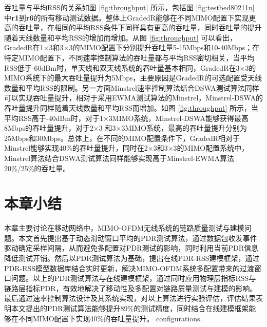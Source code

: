 吞吐量与平均RSS的关系如图 \ref{fig:throughput} 所示，包括图 \ref{fig:testbed80211n} 中\textbf{r1}到\textbf{r6}的所有移动测试数据。整体上GradedR能够在不同MIMO配置下实现更高的吞吐量，在相同的平均RSS条件下同样具有更高的吞吐量，同时吞吐量的提升随着天线数量和平均RSS的增加而增加。从图 \ref{fig:throughput} 可以看出，GradedR在1$\times$3和3$\times$3的MIMO配置下分别提升吞吐量5-15Mbps和10-40Mbps；在特定MIMO配置下，不同速率控制算法的吞吐量都与平均RSS密切相关，当平均RSS低于-60dBm时，单天线和双天线系统的吞吐量基本相同，GradedR在3$\times$3的MIMO系统下的最大吞吐量提升为5Mbps，主要原因是GradedR的可选配置受天线数量和平均RSS的限制。另一方面Minstrel速率控制算法结合DSWA测试算法同样可以实现吞吐量提升，相对于采用EWMA测试算法的Minstrel，Minstrel-DSWA的吞吐量提升同样随着天线数量和平均RSS而增加。如图 \ref{fig:throughput} 所示，当平均RSS高于-40dBm时，对于1$\times$3MIMO系统，Minstrel-DSWA能够获得最高8Mbps的吞吐量提升，对于2$\times$3 和3$\times$3MIMO系统，最高的吞吐量提升分别为25Mbps和30Mbps。总体上，在不同的MIMO配置条件下，GradedR相对于Minstrel能够实现40\%的吞吐量提升，同时在2$\times$3和3$\times$3的MIMO配置系统中，Minstrel算法结合DSWA测试算法同样能够实现高于Minstrel-EWMA算法20\%/25\%的吞吐量。


\section{本章小结}
\label{sec:conclusion3}

本章主要讨论在移动网络中，MIMO-OFDM无线系统的链路质量测试与建模问题。本文首先提出基于动态滑动窗口平均的PDR测试算法，通过数据包收发事件驱动确定采样间隔，从而避免多配置对PDR测试的影响，同时利用当前PDR信息降低测试开销。然后以PDR测试算法为基础，提出在线PDR-RSS建模框架，通过PDR-RSS模型数据库结合实时更新，解决MIMO-OFDM系统多配置带来的过渡窗口问题。以上的PDR测试算法与在线建模框架，通过同时应用物理层指标RSS与链路层指标PDR，有效地解决了移动性及多配置对链路质量测试与建模的影响。最后通过速率控制算法设计及其系统实现，对以上算法进行实验评估，评估结果表明本文提出的PDR测试算法能够提升89\%的测试精度，同时结合在线建模框架能够在不同MIMO配置下实现40\%的吞吐量提升。
configurations.

\nocite{10.1109/TMC.2009.87,Ahmed2008Online,Deek:2011,dujovne2010taxonomy,hiertz2010802.11,kim2006accurate,kim2009experimental,kolar2011mesh}
\nocite{Pelechrinis2010high,perahia2008next,sevani2012sir,zhang2008practical,Zhao2003delivery}

\nocite{Balan:2012:AHD:2348543.2348552,Bhartia:2011:HFD:2030613.2030642,Chai:2012:BES:2348543.2348564,Gollakota:2011:CRS:2018436.2018456}
\nocite{Gudipati:2011:SAR:2018436.2018455,Magistretti:2011:WRW:2030613.2030619,Magistretti:2010:IML:1859995.1860030,Manweiler:2011:ARH:1999995.2000020}
\nocite{Nguyen:2011:OCD:2030613.2030624,Qian:2011:PRU:1999995.2000026,Rozner:2010:NNP:1814433.1814445,Sanadhya:2012:ACI:2348543.2348565}